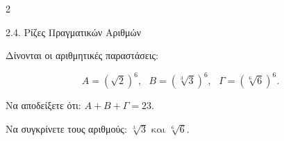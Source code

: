 \begin{ylh}{2}
    \item 2.4. Ρίζες Πραγματικών Αριθμών
\end{ylh}
Δίνονται οι αριθμητικές παραστάσεις:

\begin{equation*}
A = \left( \sqrt{2} \right)^{6},\text{  }B = \left( \sqrt[3]{3} \right)^{6},\text{    }\varGamma = \left( \sqrt[6]{6} \right)^{6}.
\end{equation*}

\begin{alist}
\item Να αποδείξετε ότι: $A + B + \varGamma = 23.$
\item Να συγκρίνετε τους αριθμούς: $\sqrt[3]{3}\text{   και  }\sqrt[6]{6}.$
\end{alist}

